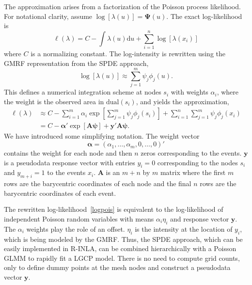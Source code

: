 \documentclass[]{interact}
\begin{document}
The approximation arises from a factorization of the Poisson process
likelihood. For notational clarity, assume \(\log[\lambda(u)]
= \boldsymbol{\Psi}(u)\). The exact log-likelihood is
\begin{equation}
\ell(\lambda) = C - \int \lambda(u) \mathrm{d}u
+ \sum_{i = 1}^{n} \log\left[\lambda(x_{i})\right]
\end{equation}
where \(C\) is a normalizing constant. The log-intensity is rewritten using the
GMRF representation from the SPDE approach,
\begin{equation}
\log\left[\lambda(u)\right]
\approx \sum_{j = 1}^{m} \psi_{j} \phi_{j}(u).
\end{equation}
This defines a numerical integration scheme at nodes \(s_{i}\)
with weights \(\alpha_{i}\), where the weight is the observed area in
\(\mathrm{dual}(s_{i})\), and yields the approximation,
\begin{align}
\ell(\lambda) &\approx C - \sum_{i = 1}^{m} \alpha_{i}
\exp\left[\sum_{j = 1}^{m} \psi_{j}\phi_{j}(s_{i})\right]
+ \sum_{i = 1}^{n} \sum_{j = 1}^{m} \psi_{j}\phi_{j}(x_{i}) \\
& = C - \boldsymbol{\alpha}'
\exp\left[\mathbf{A} \boldsymbol{\psi}\right]
+ \mathbf{y}' \mathbf{A} \boldsymbol{\psi}. \label{logpois}
\end{align}
We have introduced some simplifying notation. The weight vector
\begin{equation}
\boldsymbol{\alpha} = (\alpha_{1}, \dots, \alpha_{m}, 0, \dots, 0)'
\end{equation}
contains the weight for each node and then \(n\) zeros corresponding to the
events. \(\mathbf{y}\) is a pseudodata response vector with entries
\(y_{i} = 0\) corresponding to the nodes \(s_{i}\) and \(y_{m+i} = 1\) to the
events \(x_{i}\). \(\mathbf{A}\) is an \(m + n\) by \(m\) matrix where the
first \(m\) rows are the barycentric coordinates of each node and the final
\(n\) rows are the barycentric coordinates of each event.

The rewritten log-likelihood~\eqref{logpois} is equivalent to the log-likelihood of
independent Poisson random variables with means \(\alpha_{i} \eta_{i}\) and
response vector \(\mathbf{y}\). The \(\alpha_{i}\) weights play the role of
an offset. \(\eta_{i}\) is the intensity at the location of \(y_{i}\), which
is being modeled by the GMRF. Thus, the SPDE approach, which can be easily
implemented in R-INLA, can be combined hierarchically with a Poisson GLMM to
rapidly fit a LGCP model. There is no need to compute grid counts, only to
define dummy points at the mesh nodes and construct a pseudodata vector
\(\mathbf{y}\).
\end{document}
